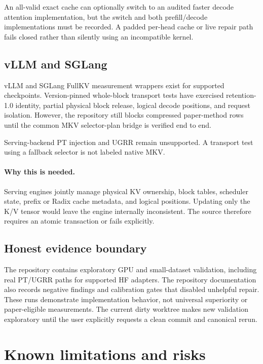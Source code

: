 \documentclass[11pt]{article}
\newcommand{\why}{\paragraph{Why this is needed.}}
\begin{document}
An all-valid exact cache can optionally switch to an audited faster decode attention
implementation, but the switch and both prefill/decode implementations must be recorded. A
padded per-head cache or live repair path fails closed rather than silently using an incompatible
kernel.

\subsection{vLLM and SGLang}

vLLM and SGLang FullKV measurement wrappers exist for supported checkpoints. Version-pinned
whole-block transport tests have exercised retention-1.0 identity, partial physical block release,
logical decode positions, and request isolation. However, the repository still blocks compressed
paper-method rows until the common MKV selector-plan bridge is verified end to end.

Serving-backend PT injection and UGRR remain unsupported. A transport test using a fallback
selector is not labeled native MKV.

\why Serving engines jointly manage physical KV ownership, block tables, scheduler state, prefix
or Radix cache metadata, and logical positions. Updating only the K/V tensor would leave the
engine internally inconsistent. The source therefore requires an atomic transaction or fails
explicitly.

\subsection{Honest evidence boundary}

The repository contains exploratory GPU and small-dataset validation, including real PT/UGRR paths
for supported HF adapters. The repository documentation also records negative findings and
calibration gates that disabled unhelpful repair. These runs demonstrate implementation behavior,
not universal superiority or paper-eligible measurements. The current dirty worktree makes new
validation exploratory until the user explicitly requests a clean commit and canonical rerun.

\section{Known limitations and risks}
\label{sec:limitations}
\end{document}
